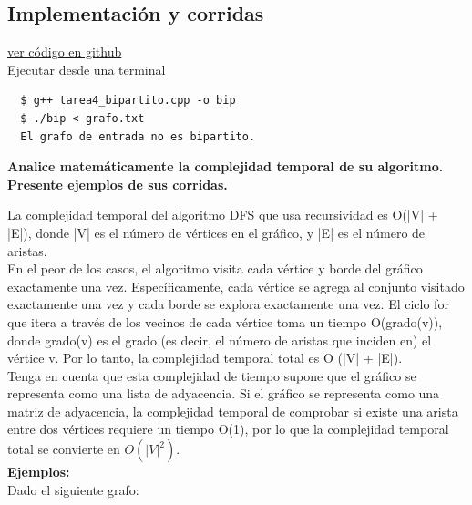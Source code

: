 \documentclass{article}
\begin{document}
\subsection{Implementación y corridas}

\href{https://github.com/luisballado/ADA/blob/main/practice_code/tarea4_bipartito.cpp}{ver código en github}\\

Ejecutar desde una terminal

\begin{commandline}
\begin{verbatim}
  $ g++ tarea4_bipartito.cpp -o bip
  $ ./bip < grafo.txt
  El grafo de entrada no es bipartito.
\end{verbatim}
\end{commandline}

\newpage
\begin{question}
  \textbf{Analice matemáticamente la complejidad temporal de su algoritmo. Presente ejemplos de sus corridas.}
\end{question}

La complejidad temporal del algoritmo DFS que usa recursividad es O(|V| + |E|), donde |V| es el número de vértices en el gráfico, y |E| es el número de aristas.\\

En el peor de los casos, el algoritmo visita cada vértice y borde del gráfico exactamente una vez. Específicamente, cada vértice se agrega al conjunto visitado exactamente una vez y cada borde se explora exactamente una vez. El ciclo for que itera a través de los vecinos de cada vértice toma un tiempo O(grado(v)), donde grado(v) es el grado (es decir, el número de aristas que inciden en) el vértice v. Por lo tanto, la complejidad temporal total es O (|V| + |E|).\\

Tenga en cuenta que esta complejidad de tiempo supone que el gráfico se representa como una lista de adyacencia. Si el gráfico se representa como una matriz de adyacencia, la complejidad temporal de comprobar si existe una arista entre dos vértices requiere un tiempo O(1), por lo que la complejidad temporal total se convierte en $O(|V|^2)$.\\

\textbf{Ejemplos:}\\

Dado el siguiente grafo:
\end{document}
